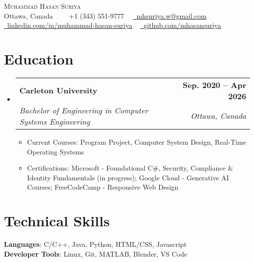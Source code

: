 \documentclass[letterpaper,11pt]{article}
\makeatletter
\newcommand{\resumeItem}[1]{
  \item\small{
    {#1 \vspace{-2pt}}
  }
}
\newcommand{\resumeSubheading}[4]{
  \vspace{-2pt}\item
    \begin{tabular*}{1.0\textwidth}[t]{l@{\extracolsep{\fill}}r}
      \textbf{#1} & \textbf{\small #2} \\
      \textit{\small#3} & \textit{\small #4} \\
    \end{tabular*}\vspace{-7pt}
}
\newcommand{\resumeSubHeadingListStart}{\begin{itemize}[leftmargin=0.0in, label={}]}
\newcommand{\resumeSubHeadingListEnd}{\end{itemize}}
\newcommand{\resumeItemListStart}{\begin{itemize}}
\newcommand{\resumeItemListEnd}{\end{itemize}\vspace{-5pt}}
\makeatother
\begin{document}

\begin{center}
    {\Huge \scshape Muhammad Hasan Suriya} \\ \vspace{1pt}
    Ottawa, Canada \ \ \
    \raisebox{-0.1\height}\faPhone\ +1 (343) 551-9777 \ \textbullet \
    \href{mailto:mhsuriya.w@gmail.com}{\raisebox{-0.2\height}\faEnvelope\ \underline{mhsuriya.w@gmail.com}} \\
    \href{https://linkedin.com/in/muhammad-hasan-suriya/}{\raisebox{-0.2\height}\faLinkedin\ \underline{linkedin.com/in/muhammad-hasan-suriya}} ~
    \href{https://github.com/mhasansuriya}{\raisebox{-0.2\height}\faGithub\ \underline{github.com/mhasansuriya}} \\
    \vspace{-8pt}
\end{center}




\section{Education}
\resumeSubHeadingListStart
\resumeSubheading
    {Carleton University}{Sep. 2020 -- Apr 2026}
    {Bachelor of Engineering in Computer Systems Engineering}{Ottawa, Canada}
\resumeItemListStart
    \resumeItem{Current Courses: Program Project, Computer System Design, Real-Time Operating Systems}
    \resumeItem{Certifications: Microsoft - Foundational C\#, Security, Compliance \& Identity Fundamentals (in progress); Google Cloud - Generative AI Courses; FreeCodeCamp - Responsive Web Design }
\resumeItemListEnd
\resumeSubHeadingListEnd

\section{Technical Skills}
\begin{itemize}[leftmargin=0.15in, label={}]
    \small{\item{
     \textbf{Languages}{: C/C++, Java, Python, HTML/CSS, Javascript} \\
     \textbf{Developer Tools}{: Linux, Git, MATLAB, Blender, VS Code} }}
\end{itemize}
\vspace{-16pt}
\end{document}
